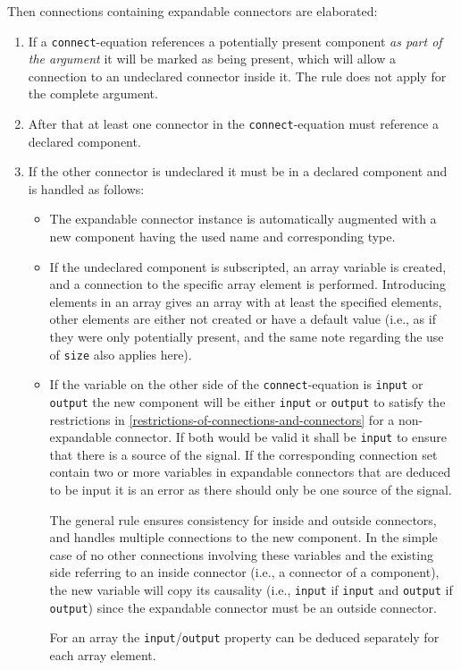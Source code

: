 Then connections containing expandable connectors are elaborated:
\begin{enumerate}
\item
  If a \lstinline!connect!-equation references a potentially present component \emph{as part of the argument} it will be marked as being present, which will allow a connection to an undeclared connector inside it.
  The rule does not apply for the complete argument.
\item
  After that at least one connector in the \lstinline!connect!-equation must reference a declared component.
\item
  If the other connector is undeclared it must be in a declared component and is handled as follows:
  \begin{itemize}
  \item
    The expandable connector instance is automatically augmented with a new component having the used name and corresponding type.
  \item
    If the undeclared component is subscripted, an array variable is created, and a connection to the specific array element is performed.
    Introducing elements in an array gives an array with at least the specified elements, other elements are either not created or have a default value (i.e., as if they were only potentially present, and the same note regarding the use of \lstinline!size! also applies here).
  \item
    If the variable on the other side of the \lstinline!connect!-equation is \lstinline!input! or \lstinline!output! the new component will be either \lstinline!input! or \lstinline!output! to satisfy the restrictions in \cref{restrictions-of-connections-and-connectors} for a non-expandable connector.
	If both would be valid it shall be \lstinline!input! to ensure that there is a source of the signal.
	If the corresponding connection set contain two or more variables in expandable connectors that are deduced to be input it is an error as there should only be one source of the signal.
    \begin{nonnormative}
    The general rule ensures consistency for inside and outside connectors, and handles multiple connections to the new component.
    In the simple case of no other connections involving these variables and the existing side referring to an inside connector (i.e., a connector of a component), the new variable will copy its causality (i.e., \lstinline!input! if \lstinline!input! and \lstinline!output! if \lstinline!output!) since the expandable connector must be an outside connector.
    \end{nonnormative}
    For an array the \lstinline!input!/\lstinline!output! property can be deduced separately for each array element.
  \end{itemize}
\end{enumerate}

